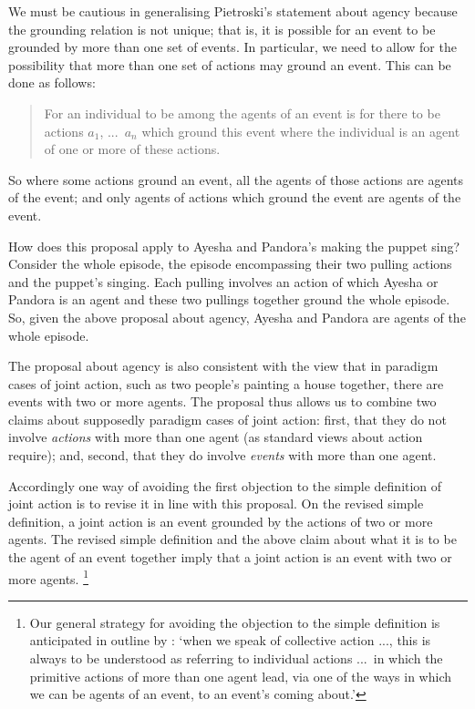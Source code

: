 \documentclass[12pt,a4paper]{extarticle}
\begin{document}
We must be cautious in generalising Pietroski's statement about agency because the grounding relation is not unique; 
that is, it is possible for an event to be grounded by more than one set of events.
In particular, we need to allow for the possibility that more than one set of actions may ground an event.
This can be done as follows:
%
\begin{quote}
	\label{agency_proposal}
For an individual to be among the agents of an event is for there to be actions $a_1$, ...\ $a_n$ which ground this event where the individual is an agent of one or more of these actions.
\end{quote}
%
So where some actions ground an event, all the agents of those actions are agents of the event; and only agents of actions which ground the event are agents of the event.

How does this proposal apply to Ayesha and Pandora's making the puppet sing?
Consider the whole episode, the episode encompassing their two pulling actions and the puppet's singing.
Each pulling involves an action of which Ayesha or Pandora is an agent
and these two pullings together ground the whole episode.
So, given the above proposal about agency, Ayesha and Pandora are agents of the whole episode. 

The proposal about agency is also consistent with the view that in paradigm cases of joint action, such as two people's painting a house together, there are events with two or more agents.
The proposal thus allows us to combine two claims about supposedly paradigm cases of joint action: first, that they do not involve \emph{actions} with more than one agent (as standard views about action require); and, second, that they do involve \emph{events} with more than one agent.

Accordingly one way of avoiding the first objection to the simple definition of joint action is to revise it in line with this proposal.  
On the revised simple definition, a joint action is an event grounded by the actions of two or more agents.
The revised simple definition and the above claim about what it is to be the agent of an event together imply that
%
	a joint action is an event with two or more agents.%
%
\footnote{
Our general strategy for avoiding the objection to the simple definition is anticipated in outline by \citet[p.\ 376]{ludwig_collective_2007}:
`when we speak of collective action ..., this is always to be understood as referring to individual actions ...\ in which the primitive actions of more than one agent lead, via one of the ways in which we can be agents of an event, to an event’s coming about.' 
}
%
\end{document}
